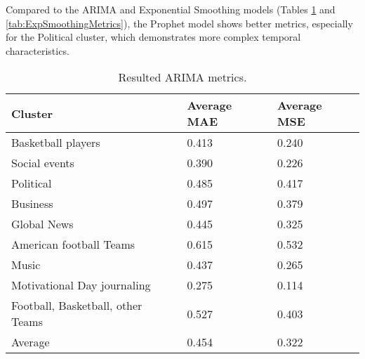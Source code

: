

\newpage
Compared to the ARIMA and Exponential Smoothing models (Tables \ref{tab:ARIMAMetrics} and \ref{tab:ExpSmoothingMetrics}), the Prophet model shows better metrics, especially for the Political cluster, which demonstrates more complex temporal characteristics.


\begin{table}[h]
\centering
\begin{tabular}{|l|l|l|}
\hline
\textbf{Cluster} & \textbf{Average MAE} & \textbf{Average MSE} \\ \hline
Basketball players & 0.413 & 0.240 \\ \hline
Social events & 0.390 & 0.226 \\ \hline
Political & 0.485 & 0.417 \\ \hline
Business & 0.497 & 0.379 \\ \hline
Global News & 0.445 & 0.325 \\ \hline
American football Teams & 0.615 & 0.532 \\ \hline
Music & 0.437 & 0.265 \\ \hline
Motivational Day journaling & 0.275 & 0.114 \\ \hline
Football, Basketball, other Teams & 0.527 & 0.403 \\ \hline
Average & 0.454 & 0.322 \\ \hline
\end{tabular}
\caption{Resulted ARIMA metrics.}
\label{tab:ARIMAMetrics}
\end{table}


